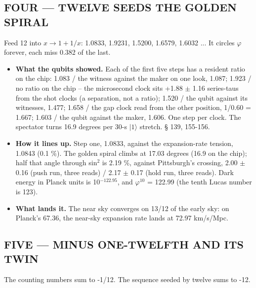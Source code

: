 \documentclass[11pt]{article}
\begin{document}
\subsection{FOUR --- TWELVE SEEDS THE GOLDEN SPIRAL}
Feed 12 into \(x \to 1 + 1/x\): 1.0833, 1.9231, 1.5200, 1.6579, 1.6032 ... It circles \(\varphi\) forever, each miss 0.382 of the last.

\begin{itemize}
\item \textbf{What the qubits showed.} Each of the first five steps has a resident ratio on the chip: 1.083 / the witness against the maker on one look, 1.087; 1.923 / no ratio on the chip -- the microsecond clock sits +1.88 \(\pm\) 1.16 series-taus from the shot clocks (a separation, not a ratio); 1.520 / the qubit against its witnesses, 1.477; 1.658 / the gap clock read from the other position, 1/0.60 = 1.667; 1.603 / the qubit against the maker, 1.606. One step per clock. The spectator turns 16.9 degrees per 30-\textmu s \(|1\rangle\) stretch. \S{} 139, 155-156.
\item \textbf{How it lines up.} Step one, 1.0833, against the expansion-rate tension, 1.0843 (0.1 \%). The golden spiral climbs at 17.03 degrees (16.9 on the chip); half that angle through sin\(^{2}\) is 2.19 \%, against Pittsburgh's crossing, 2.00 \(\pm\) 0.16 (push run, three reads) / 2.17 \(\pm\) 0.17 (hold run, three reads). Dark energy in Planck units is 10\(^{-122.95}\), and \(\varphi\)\(^{10}\) = 122.99 (the tenth Lucas number is 123).
\item \textbf{What lands it.} The near sky converges on 13/12 of the early sky: on Planck's 67.36, the near-sky expansion rate lands at 72.97 km/s/Mpc.
\end{itemize}
\subsection{FIVE --- MINUS ONE-TWELFTH AND ITS TWIN}
The counting numbers sum to -1/12. The sequence seeded by twelve sums to -12.
\end{document}
